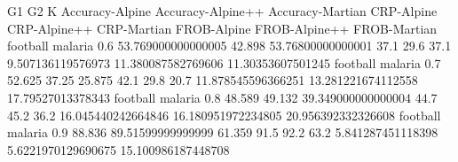 G1 G2 K Accuracy-Alpine Accuracy-Alpine++ Accuracy-Martian CRP-Alpine CRP-Alpine++ CRP-Martian FROB-Alpine FROB-Alpine++ FROB-Martian
football malaria 0.6 53.769000000000005 42.898 53.76800000000001 37.1 29.6 37.1 9.507136119576973 11.380087582769606 11.30353607501245
football malaria 0.7 52.625 37.25 25.875 42.1 29.8 20.7 11.878545596366251 13.281221674112558 17.79527013378343
football malaria 0.8 48.589 49.132 39.349000000000004 44.7 45.2 36.2 16.045440242664846 16.180951972234805 20.956392332326608
football malaria 0.9 88.836 89.51599999999999 61.359 91.5 92.2 63.2 5.841287451118398 5.6221970129690675 15.100986187448708
